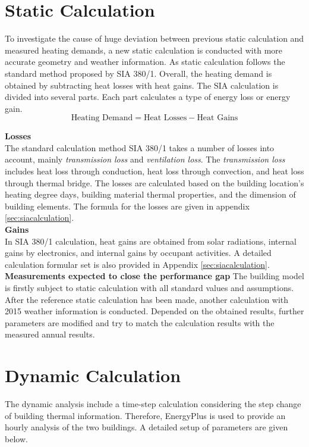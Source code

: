 \documentclass[a4paper, oneside]{discothesis}
\begin{document}
	\section{Static Calculation}
		To investigate the cause of huge deviation between previous static calculation and measured heating demands, a new static calculation is conducted with more accurate geometry and weather information. As static calculation follows the standard method proposed by SIA 380/1. Overall, the heating demand is obtained by subtracting heat losses with heat gains. The SIA calculation is divided into several parts. Each part calculates a type of energy loss or energy gain. \\
		\[\text{Heating Demand} = \text{Heat Losses} - \text{Heat Gains}\]
		
		\textbf{Losses}\\
			The standard calculation method SIA 380/1 takes a number of losses into account, mainly \textit{transmission loss} and \textit{ventilation loss}. The \textit{transmission loss} includes heat loss through conduction, heat loss through convection, and heat loss through thermal bridge. The losses are calculated based on the building location's heating degree days, building material thermal properties, and the dimension of building elements. The formula for the losses are given in appendix \ref{sec:siacalculation}.\\

		\textbf{Gains}\\
			In SIA 380/1 calculation, heat gains are obtained from solar radiations, internal gains by electronics, and internal gains by occupant activities. A detailed calculation formular set is also provided in Appendix \ref{sec:siacalculation}.\\
			
		\textbf{Measurements expected to close the performance gap}
			The building model is firstly subject to static calculation with all standard values and assumptions. After the reference static calculation has been made, another calculation with 2015 weather information is conducted. Depended on the obtained results, further parameters are modified and try to match the calculation results with the measured annual results.

		
	\section{Dynamic Calculation}
		The dynamic analysis include a time-step calculation considering the step change of building thermal information. Therefore, EnergyPlus is used to provide an hourly analysis of the two buildings. A detailed setup of parameters are given below.
		
\end{document}
